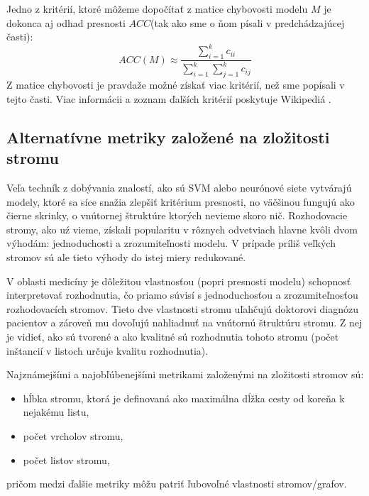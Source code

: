 Jedno z kritérií, ktoré môžeme dopočítať z matice chybovosti modelu $M$ je dokonca aj odhad presnosti $ACC$(tak ako sme o ňom písali v predchádzajúcej časti):
\begin{equation}
ACC(M) \approx \dfrac{\sum_{i=1}^{k} c_{ii}}{\sum_{i=1}^{k}\sum_{j=1}^{k} c_{ij}} \nonumber
\end{equation}
Z matice chybovosti je pravdaže možné získať viac kritérií, než sme popísali v tejto časti. Viac informácii a zoznam ďalších kritérií poskytuje Wikipediá \cite{wiki-Confusion}.

\subsection{Alternatívne metriky založené na zložitosti stromu}
Veľa techník z dobývania znalostí, ako sú SVM alebo neurónové siete vytvárajú modely, ktoré sa síce snažia zlepšiť kritérium presnosti, no väčšinou fungujú ako čierne skrinky, o vnútornej štruktúre ktorých nevieme skoro nič. Rozhodovacie stromy, ako uź vieme, získali popularitu v rôznych odvetviach hlavne kvôli dvom výhodám: jednoduchosti a zrozumiteľnosti modelu. V prípade príliš veľkých stromov sú ale tieto výhody do istej miery redukované. 

V oblasti medicíny je dôležitou vlastnosťou (popri presnosti modelu) schopnosť interpretovať rozhodnutia, čo priamo súvisí s jednoduchosťou a zrozumiteľnosťou rozhodovacích stromov. Tieto dve vlastnosti stromu uľahčujú doktorovi diagnózu pacientov a zároveň mu dovoľujú nahliadnuť na vnútornú štruktúru stromu. Z nej je vidieť, ako sú tvorené a ako kvalitné sú rozhodnutia tohoto stromu (počet inštancií v listoch určuje kvalitu rozhodnutia).

Najznámejšími a najobľúbenejšími metrikami založenými na zložitosti stromov sú:
\begin{itemize}
\item hĺbka stromu, ktorá je definovaná ako maximálna dĺžka cesty od koreňa k nejakému listu,
\item počet vrcholov stromu,
\item počet listov stromu,
\end{itemize}
pričom medzi ďalšie metriky môžu patriť ľubovoľné vlastnosti stromov/grafov.

